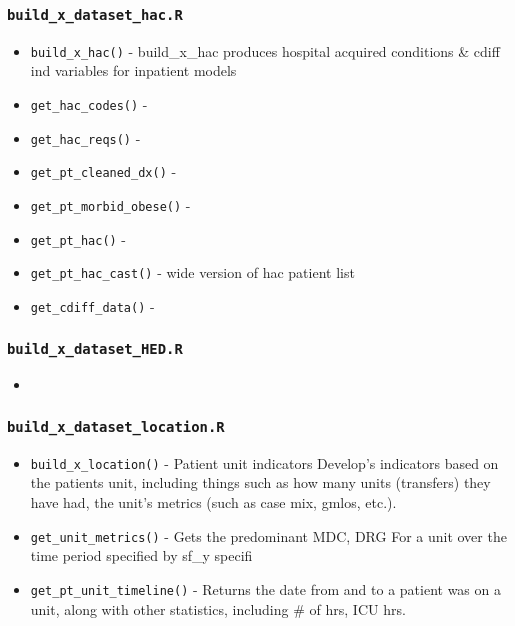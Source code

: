 \documentclass[
]{book}
\providecommand{\tightlist}{%
  \setlength{\itemsep}{0pt}\setlength{\parskip}{0pt}}
\begin{document}
\hypertarget{build_x_dataset_hac.r}{%
\subsubsection{\texorpdfstring{\texttt{build\_x\_dataset\_hac.R}}{build\_x\_dataset\_hac.R}}\label{build_x_dataset_hac.r}}

\begin{itemize}
\tightlist
\item
  \texttt{build\_x\_hac()} - build\_x\_hac produces hospital acquired conditions \& cdiff ind variables for inpatient models
\item
  \texttt{get\_hac\_codes()} -
\item
  \texttt{get\_hac\_reqs()} -
\item
  \texttt{get\_pt\_cleaned\_dx()} -
\item
  \texttt{get\_pt\_morbid\_obese()} -
\item
  \texttt{get\_pt\_hac()} -
\item
  \texttt{get\_pt\_hac\_cast()} - wide version of hac patient list
\item
  \texttt{get\_cdiff\_data()} -
\end{itemize}

\hypertarget{build_x_dataset_hed.r}{%
\subsubsection{\texorpdfstring{\texttt{build\_x\_dataset\_HED.R}}{build\_x\_dataset\_HED.R}}\label{build_x_dataset_hed.r}}

\begin{itemize}
\item
\end{itemize}

\hypertarget{build_x_dataset_location.r}{%
\subsubsection{\texorpdfstring{\texttt{build\_x\_dataset\_location.R}}{build\_x\_dataset\_location.R}}\label{build_x_dataset_location.r}}

\begin{itemize}
\tightlist
\item
  \texttt{build\_x\_location()} - Patient unit indicators Develop's indicators based on the patients unit, including things such as how many units (transfers) they have had, the unit's metrics (such as case mix, gmlos, etc.).
\item
  \texttt{get\_unit\_metrics()} - Gets the predominant MDC, DRG For a unit over the time period specified by sf\_y specifi
\item
  \texttt{get\_pt\_unit\_timeline()} - Returns the date from and to a patient was on a unit, along with other statistics, including \# of hrs, ICU hrs.
\end{itemize}
\end{document}
